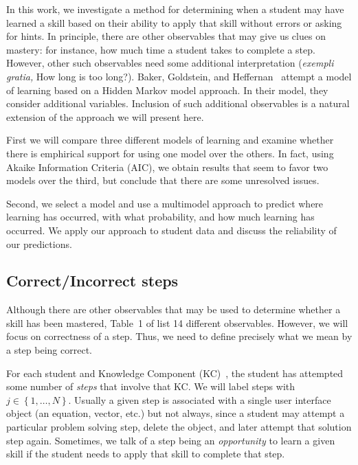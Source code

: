 \documentclass{acmlarge-edm}
\begin{document}
In this work, we investigate a method for determining when a student
may have learned a skill based on their ability to apply that skill
without errors or asking for hints.  In principle, there are other
observables that may give us clues on mastery: for instance, how much
time a student takes to complete a step.  However, other such
observables need some additional interpretation ({\em exempli gratia,}
How long is too long?).  Baker, Goldstein, and
Heffernan~\citeyear{baker_detecting_2010} attempt a model of learning
based on a Hidden Markov model approach.  In their model, they
consider additional variables.  Inclusion of such additional
observables is a natural extension of the approach we will present
here.

First we will compare three different models of learning and examine
whether there is emphirical support for using one model over the
others.  In fact, using Akaike Information Criteria (AIC), we obtain
results that seem to favor two models over the third, but conclude
that there are some unresolved issues.

Second, we select a model and use a multimodel approach to predict
where learning has occurred, with what probability, and how much
learning has occurred.  We apply our approach to student data and
discuss the reliability of our predictions.


\subsection{Correct/Incorrect steps}

Although there are other observables that may be used
to determine whether a skill has been mastered, Table~1 of
\cite{baker_detecting_2010} list 14 different observables.  
However, we will focus on correctness of a step.  Thus, we need to
define precisely what we mean by a step being correct.

For each student and Knowledge Component (KC)~\cite{vanlehn_behavior_2006}, 
the student has attempted some number of 
{\em steps} that involve that KC.   We will label
steps with $j\in\left\{1,\ldots,N\right\}$.  
Usually a given step is associated
with a single user interface object (an equation, vector, etc.)  but
not always, since a student may attempt a particular problem solving
step, delete the object, and later attempt that solution step again.
Sometimes, we talk of a step being an {\em opportunity} to learn
a given skill if the student needs to apply that skill
to complete that step.
\end{document}
